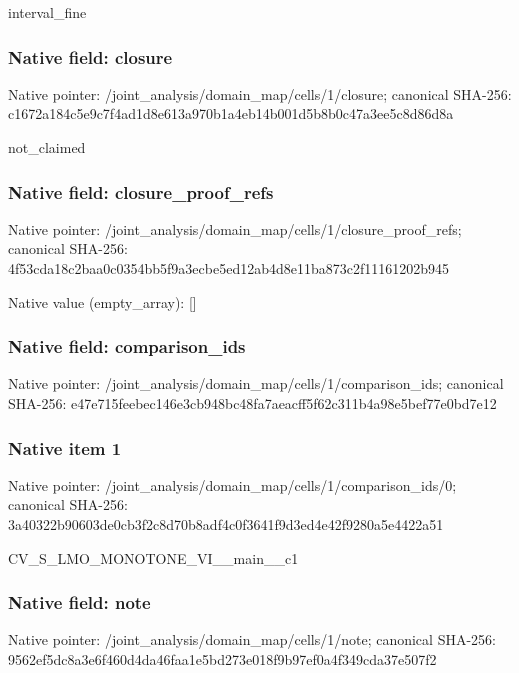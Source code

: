 \documentclass[10pt,a4paper]{article}
\begin{document}
\begingroup\raggedright\sloppy interval\_\allowbreak{}fine\par\endgroup

\subsubsection{Native field: closure}
Native pointer: /joint\_\allowbreak{}analysis/domain\_\allowbreak{}map/cells/1/closure; canonical SHA-256: c1672a184c5e9c7f4ad1d8e613a970b1a4eb14b001d5b8b0c47a3ee5c8d86d8a

\begingroup\raggedright\sloppy not\_\allowbreak{}claimed\par\endgroup

\subsubsection{Native field: closure\_\allowbreak{}proof\_\allowbreak{}refs}
Native pointer: /joint\_\allowbreak{}analysis/domain\_\allowbreak{}map/cells/1/closure\_\allowbreak{}proof\_\allowbreak{}refs; canonical SHA-256: 4f53cda18c2baa0c0354bb5f9a3ecbe5ed12ab4d8e11ba873c2f11161202b945

Native value (empty\_\allowbreak{}array): []

\subsubsection{Native field: comparison\_\allowbreak{}ids}
Native pointer: /joint\_\allowbreak{}analysis/domain\_\allowbreak{}map/cells/1/comparison\_\allowbreak{}ids; canonical SHA-256: e47e715feebec146e3cb948bc48fa7aeacff5f62c311b4a98e5bef77e0bd7e12

\subsubsection{Native item 1}
Native pointer: /joint\_\allowbreak{}analysis/domain\_\allowbreak{}map/cells/1/comparison\_\allowbreak{}ids/0; canonical SHA-256: 3a40322b90603de0cb3f2c8d70b8adf4c0f3641f9d3ed4e42f9280a5e4422a51

\begingroup\raggedright\sloppy CV\_\allowbreak{}S\_\allowbreak{}LMO\_\allowbreak{}MONOTONE\_\allowbreak{}VI\_\allowbreak{}\_\allowbreak{}main\_\allowbreak{}\_\allowbreak{}c1\par\endgroup

\subsubsection{Native field: note}
Native pointer: /joint\_\allowbreak{}analysis/domain\_\allowbreak{}map/cells/1/note; canonical SHA-256: 9562ef5dc8a3e6f460d4da46faa1e5bd273e018f9b97ef0a4f349cda37e507f2
\end{document}

